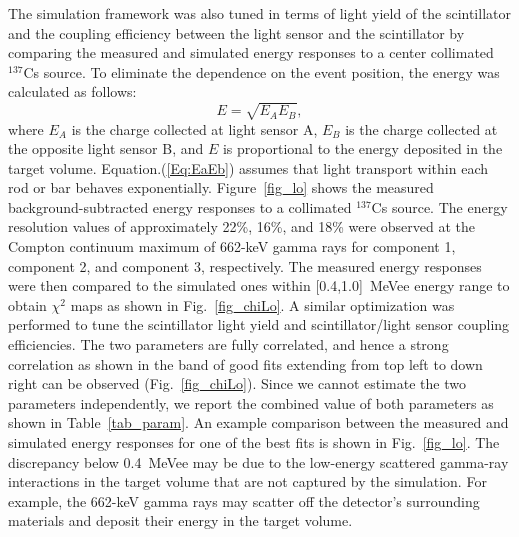 \documentclass[final,5p,times,twocolumn]{elsarticle}
\begin{document}
The simulation framework was also tuned
in terms of light yield of the scintillator and the coupling efficiency between the light sensor and the scintillator by comparing the measured and simulated energy responses to a center collimated $^{137}$Cs source. To eliminate the dependence on the event position, the energy was calculated as follows:
%
\begin{equation} \label{Eq:EaEb}
    E = \sqrt{E_A E_B},
\end{equation}
%
where $E_A$ is the charge collected at light sensor A, $E_B$ is the charge collected at the opposite light sensor B, and $E$ is proportional to the energy deposited in the target volume. 
Equation.(\ref{Eq:EaEb}) assumes that light transport within each rod or bar behaves exponentially.
Figure~\ref{fig_lo} shows the measured background-subtracted energy responses to a collimated $^{137}$Cs source. The energy resolution values of approximately 22\%, 16\%, and 18\% were observed at the Compton continuum maximum of 662-keV gamma rays for component 1, component 2, and component 3, respectively. 
The measured energy responses were then compared to the simulated ones within [0.4,1.0]~MeVee energy range to obtain $\chi^2$ maps as shown in Fig.~\ref{fig_chiLo}.
A similar optimization was performed to tune the scintillator light yield and scintillator/light sensor coupling efficiencies.
The two parameters are fully correlated, and hence a strong correlation as shown in the band of good fits extending from top left to down right can be observed (Fig.~\ref{fig_chiLo}). Since we cannot estimate the two parameters independently, we report the combined value of both parameters as shown in Table~\ref{tab_param}.
An example comparison between the measured and simulated energy responses for one of the best fits is shown in Fig.~\ref{fig_lo}.
The discrepancy below 0.4~MeVee may be due to the low-energy scattered gamma-ray interactions in the target volume that are not captured by the simulation.
For example, the 662-keV gamma rays may scatter off the detector's surrounding materials and deposit their energy in the target volume.
\end{document}
